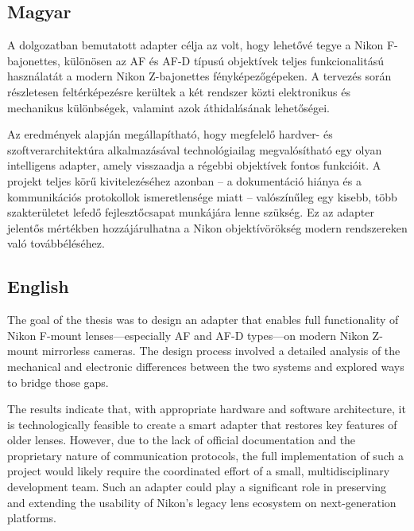 \subsection{Magyar}
A dolgozatban bemutatott adapter célja az volt, hogy lehetővé tegye a Nikon F-bajonettes, 
különösen az AF és AF-D típusú objektívek teljes funkcionalitású használatát a modern 
Nikon Z-bajonettes fényképezőgépeken. A tervezés során részletesen feltérképezésre kerültek 
a két rendszer közti elektronikus és mechanikus különbségek, valamint azok áthidalásának 
lehetőségei.

Az eredmények alapján megállapítható, hogy megfelelő hardver- és szoftverarchitektúra 
alkalmazásával technológiailag megvalósítható egy olyan intelligens adapter, amely 
visszaadja a régebbi objektívek fontos funkcióit. A projekt teljes körű kivitelezéséhez 
azonban – a dokumentáció hiánya és a kommunikációs protokollok ismeretlensége miatt – 
valószínűleg egy kisebb, több szakterületet lefedő fejlesztőcsapat munkájára lenne szükség. 
Ez az adapter jelentős mértékben hozzájárulhatna a Nikon objektívörökség modern rendszereken 
való továbbéléséhez.

\subsection{English}
The goal of the thesis was to design an adapter that enables full functionality of Nikon 
F-mount lenses—especially AF and AF-D types—on modern Nikon Z-mount mirrorless cameras. 
The design process involved a detailed analysis of the mechanical and electronic differences 
between the two systems and explored ways to bridge those gaps.

The results indicate that, with appropriate hardware and software architecture, it is 
technologically feasible to create a smart adapter that restores key features of older lenses. 
However, due to the lack of official documentation and the proprietary nature of communication 
protocols, the full implementation of such a project would likely require the coordinated effort 
of a small, multidisciplinary development team. Such an adapter could play a significant role in 
preserving and extending the usability of Nikon's legacy lens ecosystem on next-generation platforms.